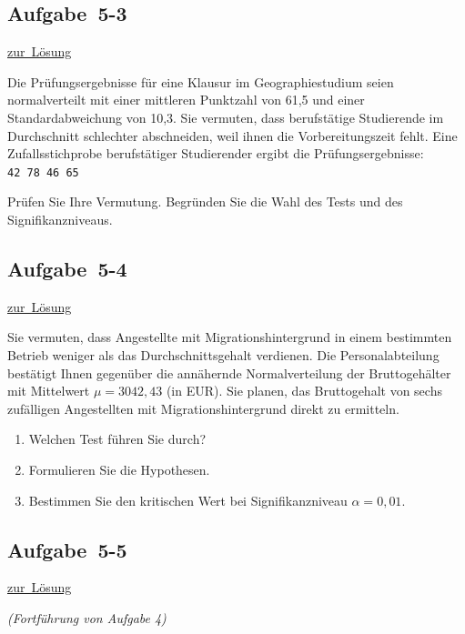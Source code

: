 \documentclass[
  11pt,
  ngerman,
  a4paper,
]{report}
\providecommand{\tightlist}{%
  \setlength{\itemsep}{0pt}\setlength{\parskip}{0pt}}
\begin{document}
\hypertarget{aufgabe-5-3}{%
\subsection{Aufgabe~5-3}\label{aufgabe-5-3}}

\protect\hyperlink{loesung-5-3}{zur~Lösung}

Die Prüfungsergebnisse für eine Klausur im Geographiestudium seien normalverteilt mit einer mittleren Punktzahl von 61,5 und einer Standardabweichung von 10,3. Sie vermuten, dass berufstätige Studierende im Durchschnitt schlechter abschneiden, weil ihnen die Vorbereitungszeit fehlt. Eine Zufallsstichprobe berufstätiger Studierender ergibt die Prüfungsergebnisse: \texttt{42\ 78\ 46\ 65}

Prüfen Sie Ihre Vermutung. Begründen Sie die Wahl des Tests und des Signifikanzniveaus.

\hypertarget{aufgabe-5-4}{%
\subsection{Aufgabe~5-4}\label{aufgabe-5-4}}

\protect\hyperlink{loesung-5-4}{zur~Lösung}

Sie vermuten, dass Angestellte mit Migrationshintergrund in einem bestimmten Betrieb weniger als das Durchschnittsgehalt verdienen. Die Personalabteilung bestätigt Ihnen gegenüber die annähernde Normalverteilung der Bruttogehälter mit Mittelwert \(\mu=3042{,}43\) (in EUR). Sie planen, das Bruttogehalt von sechs zufälligen Angestellten mit Migrationshintergrund direkt zu ermitteln.\nopagebreak 

\begin{enumerate}
\def\labelenumi{\alph{enumi})}
\tightlist
\item
  Welchen Test führen Sie durch?
\item
  Formulieren Sie die Hypothesen.
\item
  Bestimmen Sie den kritischen Wert bei Signifikanzniveau \(\alpha=0{,}01\).
\end{enumerate}

\hypertarget{aufgabe-5-5}{%
\subsection{Aufgabe~5-5}\label{aufgabe-5-5}}

\protect\hyperlink{loesung-5-5}{zur~Lösung}

\emph{(Fortführung von Aufgabe 4)}
\end{document}
